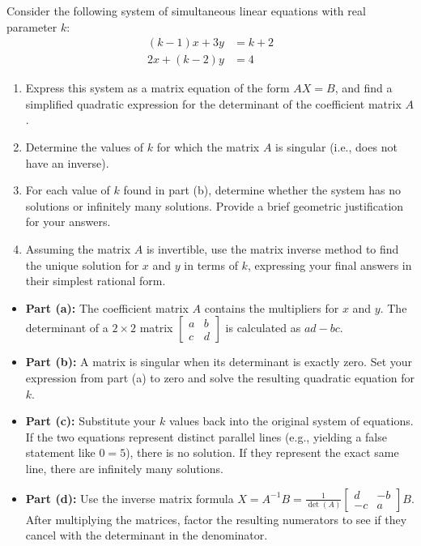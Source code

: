 \begin{problem}
Consider the following system of simultaneous linear equations with real parameter $k$:
\begin{align*}
(k - 1)x + 3y &= k + 2 \\
2x + (k - 2)y &= 4
\end{align*}

\begin{enumerate}[label=\textbf{(\alph*)}]
    \item Express this system as a matrix equation of the form $AX = B$, and find a simplified quadratic expression for the determinant of the coefficient matrix $A$.
    \item Determine the values of $k$ for which the matrix $A$ is singular (i.e., does not have an inverse).
    \item For each value of $k$ found in part (b), determine whether the system has no solutions or infinitely many solutions. Provide a brief geometric justification for your answers.
    \item Assuming the matrix $A$ is invertible, use the matrix inverse method to find the unique solution for $x$ and $y$ in terms of $k$, expressing your final answers in their simplest rational form.
\end{enumerate}
\end{problem}

\begin{hint}
\begin{itemize}
    \item \textbf{Part (a):} The coefficient matrix $A$ contains the multipliers for $x$ and $y$. The determinant of a $2 \times 2$ matrix $\begin{bmatrix} a & b \\ c & d \end{bmatrix}$ is calculated as $ad - bc$.
    \item \textbf{Part (b):} A matrix is singular when its determinant is exactly zero. Set your expression from part (a) to zero and solve the resulting quadratic equation for $k$.
    \item \textbf{Part (c):} Substitute your $k$ values back into the original system of equations. If the two equations represent distinct parallel lines (e.g., yielding a false statement like $0=5$), there is no solution. If they represent the exact same line, there are infinitely many solutions.
    \item \textbf{Part (d):} Use the inverse matrix formula $X = A^{-1}B = \frac{1}{\det(A)} \begin{bmatrix} d & -b \\ -c & a \end{bmatrix} B$. After multiplying the matrices, factor the resulting numerators to see if they cancel with the determinant in the denominator.
\end{itemize}
\end{hint}

